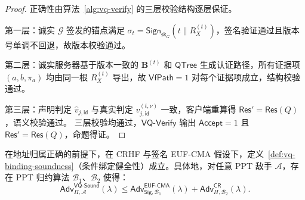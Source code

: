 \begin{proof}
正确性由算法~\ref{alg:vq-verify} 的三层校验结构逐层保证。

第一层：诚实 $\mathcal{G}$ 签发的锚点满足 $\sigma_t=\mathsf{Sign}_{\mathsf{sk}_G}(t\|R_X^{(t)})$，签名验证通过且版本号单调不回退，故版本校验通过。

第二层：诚实服务器基于版本一致的 $\mathbf{B}^{(t)}$ 和 $\mathsf{QTree}$ 生成认证路径，所有证据项 $(a,b,\pi_a)$ 均由同一根 $R_X^{(t)}$ 导出，故 $\mathsf{VfPath}=1$ 对每个证据项成立，结构校验通过。

第三层：声明判定 $\widehat{v}_{j,\mathsf{id}}$ 与真实判定 $v_{j,\mathsf{id}}^{(t,\nu)}$ 一致，客户端重算得 $\mathsf{Res}'=\mathsf{Res}(Q)$，语义校验通过。
三层校验均通过，$\mathsf{VQ\text{-}Verify}$ 输出 $\mathsf{Accept}=1$ 且 $\mathsf{Res}'=\mathsf{Res}(Q)$，命题得证。
\end{proof}

\begin{proposition}[条件绑定健全性]\label{prop:vq-sound}
在地址归属正确的前提下，在 CRHF 与签名 EUF-CMA 假设下，定义~\ref{def:vq-binding-soundness}（条件绑定健全性）成立。具体地，对任意 PPT 敌手 $\mathcal{A}$，存在 PPT 归约算法 $\mathcal{B}_1$、$\mathcal{B}_2$ 使得：
\begin{equation}
\mathsf{Adv}_{\Pi,\mathcal{A}}^{\mathsf{VQ\text{-}Sound}}(\lambda) \le \mathsf{Adv}_{\mathsf{Sig},\mathcal{B}_1}^{\mathsf{EUF\text{-}CMA}}(\lambda) + \mathsf{Adv}_{H,\mathcal{B}_2}^{\mathsf{CR}}(\lambda).
\end{equation}
\end{proposition}

